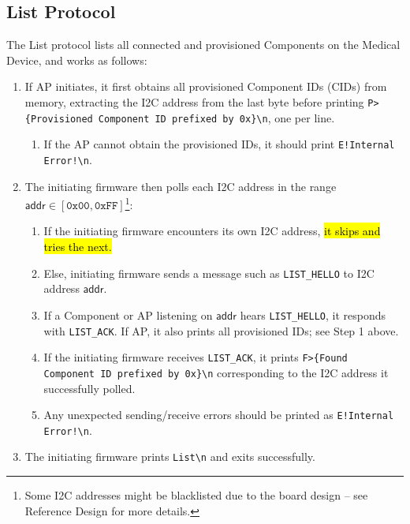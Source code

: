 \subsection{List Protocol}

The List protocol lists all connected and provisioned Components on the Medical Device, and works as follows:
\begin{enumerate}
    \item If AP initiates, it first obtains all provisioned Component IDs (CIDs) from memory, extracting the I2C address from the last byte before printing \texttt{P>\{Provisioned Component ID prefixed by 0x\}\textbackslash n}, one per line.
    \begin{enumerate}
        \item If the AP cannot obtain the provisioned IDs, it should print \texttt{E!Internal Error!\textbackslash n}.%
    \end{enumerate}
    \item The initiating firmware then polls each I2C address in the range $\mathsf{addr} \in [\texttt{0x00}, \texttt{0xFF}]$\footnote{Some I2C addresses might be blacklisted due to the board design -- see Reference Design for more details.}:
    \begin{enumerate}
        \item If the initiating firmware encounters its own I2C address, \hl{it skips and tries the next.}
        \item Else, initiating firmware sends a message such as \texttt{LIST\_HELLO} to I2C address $\mathsf{addr}$.
        \item If a Component or AP listening on $\mathsf{addr}$ hears \texttt{LIST\_HELLO}, it responds with \texttt{LIST\_ACK}. If AP, it also prints all provisioned IDs; see Step 1 above.
        \item If the initiating firmware receives \texttt{LIST\_ACK}, it prints \texttt{F>\{Found Component ID prefixed by 0x\}\textbackslash n} corresponding to the I2C address it successfully polled.
        \item Any unexpected sending/receive errors should be printed as \texttt{E!Internal Error!\textbackslash n}.%
    \end{enumerate}
    \item The initiating firmware prints \texttt{List\textbackslash n} and exits successfully.
\end{enumerate}

